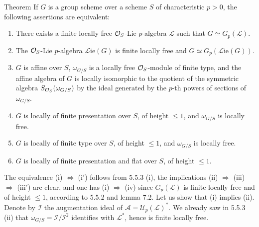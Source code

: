 \begin{enonce}{Theorem}{}\label{VIIA.7.4}
If $G$ is a group scheme over a scheme $S$ of characteristic $p>0$, the following assertions are equivalent:
\begin{enumerate}[label={},leftmargin=2.2em]
\item[(i)] There exists a finite locally free $\mathcal{O}_S$-Lie $p$-algebra $\mathscr L$ such that $G\simeq G_p(\mathscr L)$.
\item[(i$'$)] The $\mathcal{O}_S$-Lie $p$-algebra $\mathscr L\!\mathrm{ie}(G)$ is finite locally free and $G\simeq G_p(\mathscr L\!\mathrm{ie}(G))$.
\item[(ii)] $G$ is affine over $S$, $\omega_{G/S}$ is a locally free $\mathcal{O}_S$-module of finite type, and the affine algebra of $G$ is locally isomorphic to the quotient of the symmetric algebra $S_{\mathcal{O}_S}(\omega_{G/S})$ by the ideal generated by the $p$-th powers of sections of $\omega_{G/S}$.
\item[(iii)] $G$ is locally of finite presentation over $S$, of height $\leq1$, and $\omega_{G/S}$ is locally free.
\item[(iii$'$)] $G$ is locally of finite type over $S$, of height $\leq1$, and $\omega_{G/S}$ is locally free.
\item[(iv)] $G$ is locally of finite presentation and flat over $S$, of height $\leq1$.
\end{enumerate}
\end{enonce}

The equivalence (i) $\Leftrightarrow$ (i$'$) follows from 5.5.3 (i), the implications (ii) $\Rightarrow$ (iii) $\Rightarrow$ (iii$'$) are clear, and one has (i) $\Rightarrow$ (iv) since $G_p(\mathscr L)$ is finite locally free and of height $\leq1$, according to 5.5.2 and lemma 7.2. Let us show that (i) implies (ii). Denote by $\mathscr I$ the augmentation ideal of $\mathscr A=\mathscr U_p(\mathscr L)^*$. We already saw in 5.5.3 (ii) that $\omega_{G/S}=\mathscr I/\mathscr I^2$ identifies with $\mathscr L^*$, hence is finite locally free.


